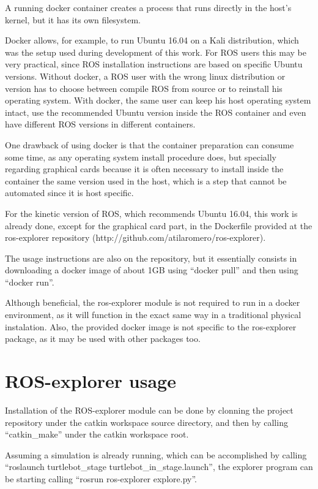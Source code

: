 \documentclass[a4paper,twocolumn]{article}
\begin{document}
    A running docker container creates a process that runs directly in the host's kernel, but it has its own filesystem. 

    Docker allows, for example, to run Ubuntu 16.04 on a Kali distribution, which was the setup used during development of this work. For ROS\cite{ROS} users this may be very practical, since ROS installation instructions are based on specific Ubuntu versions. Without docker, a ROS user with the wrong linux distribution or version has to choose between compile ROS from source or to reinstall his operating system. With docker, the same user can keep his host operating system intact, use the recommended Ubuntu\cite{ubuntu} version inside the ROS container and even have different ROS versions in different containers.

    One drawback of using docker is that the container preparation can consume some time, as any operating system install procedure does, but specially regarding graphical cards because it is often necessary to install inside the container the same version used in the host, which is a step that cannot be automated since it is host specific.

    For the kinetic version of ROS, which recommends Ubuntu 16.04, this work is already done, except for the graphical card part, in the Dockerfile provided at the ros-explorer\cite{ros-explorer} repository (http://github.com/atilaromero/ros-explorer).

    The usage instructions are also on the repository, but it essentially consists in downloading a docker image of about 1GB using ``docker pull'' and then using ``docker run''.

    Although beneficial, the ros-explorer module is not required to run in a docker environment, as it will function in the exact same way in a traditional physical instalation. Also, the provided docker image is not specific to the ros-explorer package, as it may be used with other packages too.

\section{ROS-explorer usage}
    Installation of the ROS-explorer module can be done by clonning the project repository under the catkin workspace source directory, and then by calling ``catkin\_make'' under the catkin workspace root.

    Assuming a simulation is already running, which can be accomplished by calling ``roslaunch turtlebot\_stage turtlebot\_in\_stage.launch'', the explorer program can be starting calling ``rosrun ros-explorer explore.py''.
\end{document}
